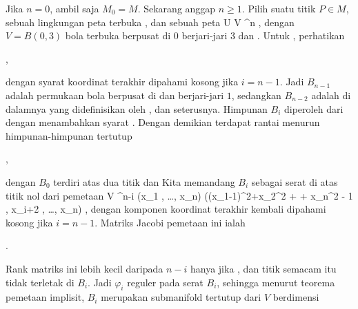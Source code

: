 Jika $n=0$, ambil saja $M_0=M$. Sekarang anggap $n\geq1$. Pilih suatu titik $P\in M$, sebuah lingkungan peta terbuka
,
dan sebuah peta
\maabbdisp {\alpha} { U } {V \subseteq \R^n
} {,}
dengan $V=B(0,3)$ bola terbuka berpusat di $0$ berjari-jari $3$ dan
.
Untuk
, perhatikan

 { , }

dengan syarat koordinat terakhir dipahami kosong jika $i=n-1$.
Jadi $B_{n-1}$ adalah permukaan bola berpusat di
dan berjari-jari $1$, sedangkan $B_{n-2}$ adalah
di dalamnya yang didefinisikan oleh
, dan seterusnya. Himpunan $B_i$ diperoleh dari
dengan menambahkan syarat
.
Dengan demikian terdapat rantai menurun himpunan-himpunan tertutup

 { , }

dengan $B_0$ terdiri atas dua titik
dan
Kita memandang $B_i$ sebagai serat di atas titik nol dari pemetaan
 { V } {\R^{n-i}
} {(x_1 , \ldots , x_n) } {  ((x_1-1)^2+x_2^2 + \cdots + x_n^2 - 1 , x_{i+2} , \ldots , x_n)
} {,}
dengan komponen koordinat terakhir kembali dipahami kosong jika $i=n-1$.
Matriks Jacobi pemetaan ini ialah

 { . }

Rank matriks ini lebih kecil daripada $n-i$ hanya jika
,
dan titik semacam itu tidak terletak di $B_i$. Jadi $\varphi_i$ reguler pada serat $B_i$, sehingga menurut teorema pemetaan implisit, $B_i$ merupakan submanifold tertutup dari $V$ berdimensi


